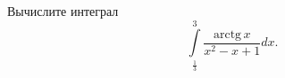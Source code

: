 \documentclass{article}
\begin{document}
Вычислите интеграл
$$\int\limits_{\frac13}^3 \frac{\textrm{arctg}\, x}{x^2-x+1} dx.$$
\end{document}
